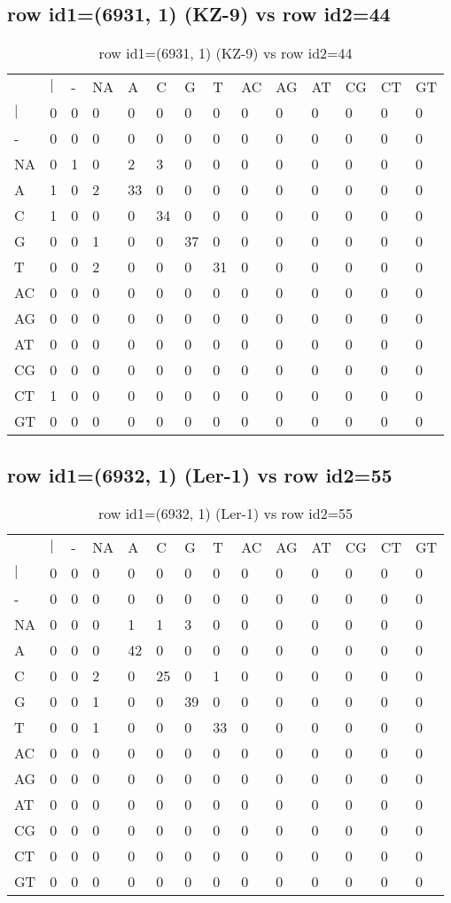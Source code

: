 \subsection{row id1=(6931, 1) (KZ-9) vs row id2=44}
\begin{center}
\begin{longtable}{|l|l|l|l|l|l|l|l|l|l|l|l|l|l|}
\caption{row id1=(6931, 1) (KZ-9) vs row id2=44} \label{table_dm128}\\
\hline
\\
\hline
&$|$&-&NA&A&C&G&T&AC&AG&AT&CG&CT&GT\\
$|$&0&0&0&0&0&0&0&0&0&0&0&0&0\\
-&0&0&0&0&0&0&0&0&0&0&0&0&0\\
NA&0&1&0&2&3&0&0&0&0&0&0&0&0\\
A&1&0&2&33&0&0&0&0&0&0&0&0&0\\
C&1&0&0&0&34&0&0&0&0&0&0&0&0\\
G&0&0&1&0&0&37&0&0&0&0&0&0&0\\
T&0&0&2&0&0&0&31&0&0&0&0&0&0\\
AC&0&0&0&0&0&0&0&0&0&0&0&0&0\\
AG&0&0&0&0&0&0&0&0&0&0&0&0&0\\
AT&0&0&0&0&0&0&0&0&0&0&0&0&0\\
CG&0&0&0&0&0&0&0&0&0&0&0&0&0\\
CT&1&0&0&0&0&0&0&0&0&0&0&0&0\\
GT&0&0&0&0&0&0&0&0&0&0&0&0&0\\
\hline
\end{longtable}
\end{center}

\subsection{row id1=(6932, 1) (Ler-1) vs row id2=55}
\begin{center}
\begin{longtable}{|l|l|l|l|l|l|l|l|l|l|l|l|l|l|}
\caption{row id1=(6932, 1) (Ler-1) vs row id2=55} \label{table_dm130}\\
\hline
\\
\hline
&$|$&-&NA&A&C&G&T&AC&AG&AT&CG&CT&GT\\
$|$&0&0&0&0&0&0&0&0&0&0&0&0&0\\
-&0&0&0&0&0&0&0&0&0&0&0&0&0\\
NA&0&0&0&1&1&3&0&0&0&0&0&0&0\\
A&0&0&0&42&0&0&0&0&0&0&0&0&0\\
C&0&0&2&0&25&0&1&0&0&0&0&0&0\\
G&0&0&1&0&0&39&0&0&0&0&0&0&0\\
T&0&0&1&0&0&0&33&0&0&0&0&0&0\\
AC&0&0&0&0&0&0&0&0&0&0&0&0&0\\
AG&0&0&0&0&0&0&0&0&0&0&0&0&0\\
AT&0&0&0&0&0&0&0&0&0&0&0&0&0\\
CG&0&0&0&0&0&0&0&0&0&0&0&0&0\\
CT&0&0&0&0&0&0&0&0&0&0&0&0&0\\
GT&0&0&0&0&0&0&0&0&0&0&0&0&0\\
\hline
\end{longtable}
\end{center}

